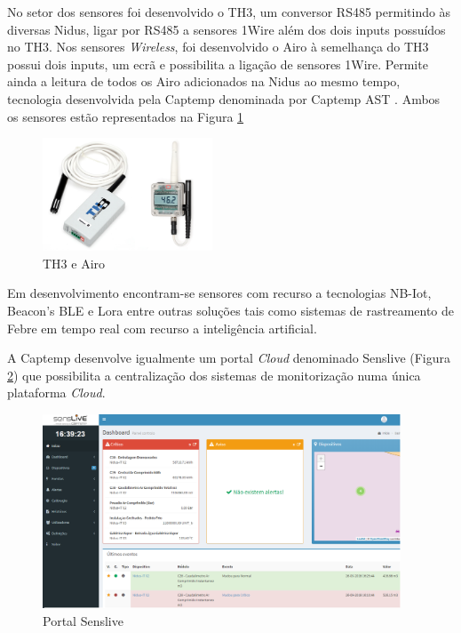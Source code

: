 No setor dos sensores foi desenvolvido o TH3, um conversor RS485 permitindo às diversas Nidus, ligar por RS485 a sensores 1Wire além dos dois inputs possuídos no TH3. Nos sensores \textit{Wireless}, foi desenvolvido o Airo à semelhança do TH3 possui dois inputs, um ecrã e possibilita a ligação de sensores 1Wire. Permite ainda a leitura de todos os Airo adicionados na Nidus ao mesmo tempo, tecnologia desenvolvida pela Captemp denominada por Captemp AST \cite{Captemp_AST}. Ambos os sensores estão representados na Figura \ref{figairoth3} 
\begin{figure}[ht]
  \centering
  \includegraphics[width=0.45\textwidth]{images/th3airo.png}
  \caption{ TH3 e Airo}\label{figairoth3}
\end{figure}
\par
Em desenvolvimento encontram-se sensores com recurso a tecnologias NB-Iot, Beacon's BLE e Lora entre outras soluções tais como sistemas de rastreamento de Febre em tempo real com recurso a inteligência artificial.
\par
A Captemp desenvolve igualmente um portal \textit{Cloud} denominado Senslive (Figura \ref{figsenslive}) que possibilita a centralização dos sistemas de monitorização numa única plataforma \textit{Cloud}.

\begin{figure}[ht]
  \centering
  \includegraphics[width=0.95\textwidth]{images/mwsnap0791.png}
  \caption{ Portal Senslive}\label{figsenslive}
\end{figure}



